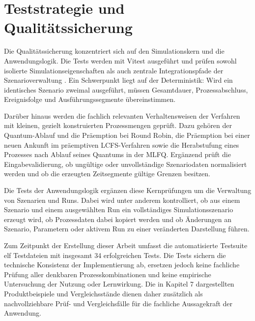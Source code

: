 \section{Teststrategie und Qualitätssicherung}

Die Qualitätssicherung konzentriert sich auf den Simulationskern und die Anwendungslogik. Die Tests werden mit Vitest ausgeführt und prüfen sowohl isolierte Simulationseigenschaften als auch zentrale Integrationspfade der Szenarioverwaltung \cite{vitest}. Ein Schwerpunkt liegt auf der Deterministik: Wird ein identisches Szenario zweimal ausgeführt, müssen Gesamtdauer, Prozessabschluss, Ereignisfolge und Ausführungssegmente übereinstimmen.

Darüber hinaus werden die fachlich relevanten Verhaltensweisen der Verfahren mit kleinen, gezielt konstruierten Prozessmengen geprüft. Dazu gehören der Quantum-Ablauf und die Präemption bei Round Robin, die Präemption bei einer neuen Ankunft im präemptiven LCFS-Verfahren sowie die Herabstufung eines Prozesses nach Ablauf seines Quantums in der MLFQ. Ergänzend prüft die Eingabevalidierung, ob ungültige oder unvollständige Szenariodaten normalisiert werden und ob die erzeugten Zeitsegmente gültige Grenzen besitzen.

Die Tests der Anwendungslogik ergänzen diese Kernprüfungen um die Verwaltung von Szenarien und Runs. Dabei wird unter anderem kontrolliert, ob aus einem Szenario und einem ausgewählten Run ein vollständiges Simulationsszenario erzeugt wird, ob Prozessdaten dabei kopiert werden und ob Änderungen an Szenario, Parametern oder aktivem Run zu einer veränderten Darstellung führen.

Zum Zeitpunkt der Erstellung dieser Arbeit umfasst die automatisierte Testsuite elf Testdateien mit insgesamt 34 erfolgreichen Tests. Die Tests sichern die technische Konsistenz der Implementierung ab, ersetzen jedoch keine fachliche Prüfung aller denkbaren Prozesskombinationen und keine empirische Untersuchung der Nutzung oder Lernwirkung. Die in Kapitel 7 dargestellten Produktbeispiele und Vergleichsstände dienen daher zusätzlich als nachvollziehbare Prüf- und Vergleichsfälle für die fachliche Aussagekraft der Anwendung.
